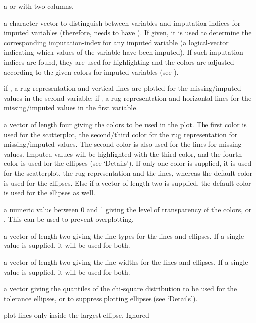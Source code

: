 \begin{Arguments}
\begin{ldescription}
\item[\code{x}] a  or  with two columns.
\item[\code{delimiter}] a character-vector to distinguish between variables
and imputation-indices for imputed variables (therefore,  needs
to have ). If given, it is used to determine the
corresponding imputation-index for any imputed variable (a logical-vector
indicating which values of the variable have been imputed). If such
imputation-indices are found, they are used for highlighting and the
colors are adjusted	according to the given colors for imputed variables
(see ).
\item[\code{side}] if , a rug representation and vertical lines are 
plotted for the missing/imputed values in the second variable; if , a 
rug representation and horizontal lines for the missing/imputed values in the first 
variable.
\item[\code{col}] a vector of length four giving the colors to be used in the plot.  
The first color is used for the scatterplot, the second/third color for the 
rug representation for missing/imputed values. The second color is also
used for the lines for missing values. Imputed values will be highlighted
with the third color, and the fourth color is used for the ellipses (see
`Details'). If only one color is supplied, it is used for the
scatterplot, the rug representation and the lines, whereas the default
color is used for the ellipses.  Else if a vector of length two is 
supplied, the default color is used for the ellipses as well.
\item[\code{alpha}] a numeric value between 0 and 1 giving the level of transparency 
of the colors, or .  This can be used to prevent overplotting.
\item[\code{lty}] a vector of length two giving the line types for the lines and
ellipses.  If a single value is supplied, it will be used for both.
\item[\code{lwd}] a vector of length two giving the line widths for the lines and
ellipses.  If a single value is supplied, it will be used for both.
\item[\code{quantiles}] a vector giving the quantiles of the chi-square distribution 
to be used for the tolerance ellipses, or  to suppress plotting 
ellipses (see `Details').
\item[\code{inEllipse}] plot lines only inside the largest ellipse.  Ignored 

\end{ldescription}
\end{Arguments}
